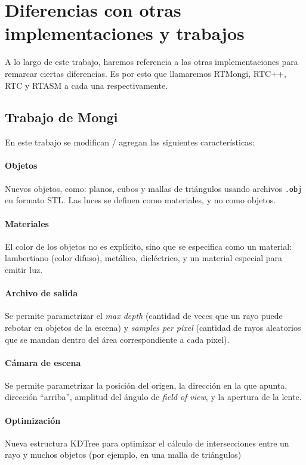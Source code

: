 \section{Diferencias con otras implementaciones y trabajos} \label{sec:diferencias}

A lo largo de este trabajo, haremos referencia a las otras implementaciones para
remarcar ciertas diferencias. Es por esto que llamaremos RTMongi, RTC++, RTC y
RTASM a cada una respectivamente.

\subsection{Trabajo de Mongi}

En este trabajo se modifican / agregan las siguientes características:

\paragraph{Objetos} Nuevos objetos, como: planos, cubos y mallas de triángulos
usando archivos \texttt{.obj} en formato STL. Las luces se definen como materiales, y no
como objetos.

\paragraph{Materiales} El color de los objetos no es explícito, sino que se
especifica como un material: lambertiano (color difuso), metálico, dieléctrico, y
un material especial para emitir luz.

\paragraph{Archivo de salida} Se permite parametrizar el \textit{max depth}
(cantidad de veces que un rayo puede rebotar en objetos de la escena) y
\textit{samples per pixel} (cantidad de rayos aleatorios que se mandan dentro
del área correspondiente a cada pixel).

\paragraph{Cámara de escena} Se permite parametrizar la posición del origen, la
dirección en la que apunta, dirección ``arriba'', amplitud del ángulo de
\textit{field of view}, y la apertura de la lente.

\paragraph{Optimización} Nueva estructura KDTree para optimizar el cálculo de
intersecciones entre un rayo y muchos objetos (por ejemplo, en una malla de
triángulos)

